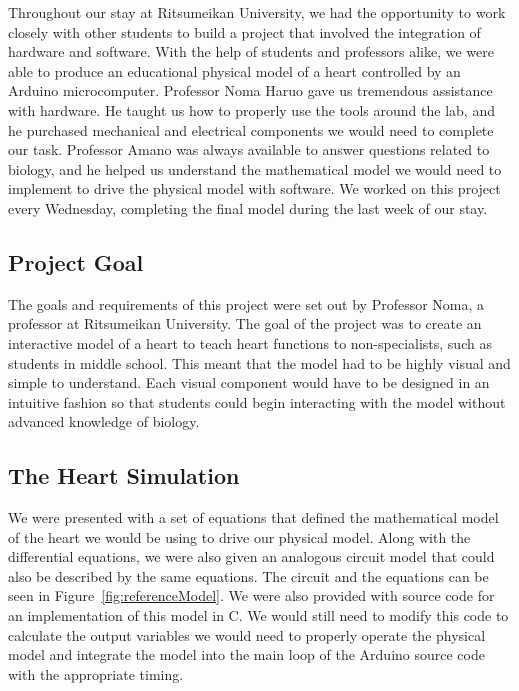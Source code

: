 \documentclass[a4paper, 10pt, american, titlepage]{article}
\begin{document}
Throughout our stay at Ritsumeikan University, we had the opportunity to work
closely with other students to build a project that involved the
integration of hardware and software. With the help of students and professors
alike, we were able to produce an educational physical model of a heart
controlled by an Arduino microcomputer. Professor Noma Haruo gave us tremendous
assistance with hardware. He taught us how to properly use the tools around the
lab, and he purchased mechanical and electrical components we would need to
complete our task. Professor Amano was always available to answer questions
related to biology, and he helped us understand the mathematical model we would
need to implement to drive the physical model with software. We worked on this
project every Wednesday, completing the final model during the last week of our
stay.

\subsection{Project Goal}
\label{sec:projectGoal}

The goals and requirements of this project were set out by Professor Noma, a
professor at Ritsumeikan University. The goal of the project was to create an
interactive model of a heart to teach heart functions to non-specialists, such
as students in middle school. This meant that the model had to be highly visual
and simple to understand. Each visual component would have to be designed in an
intuitive fashion so that students could begin interacting with the model
without advanced knowledge of biology.

\subsection{The Heart Simulation}
\label{sec:theHeartSimulation}

We were presented with a set of equations that defined the mathematical model of
the heart we would be using to drive our physical model. Along with the
differential equations, we were also given an analogous circuit model that could
also be described by the same equations. The circuit and the equations can be
seen in Figure~\ref{fig:referenceModel}. We were also provided with source code
for an implementation of this model in C. We would still need to modify this
code to calculate the output variables we would need to properly operate the
physical model and integrate the model into the main loop of the Arduino source
code with the appropriate timing.
\end{document}
